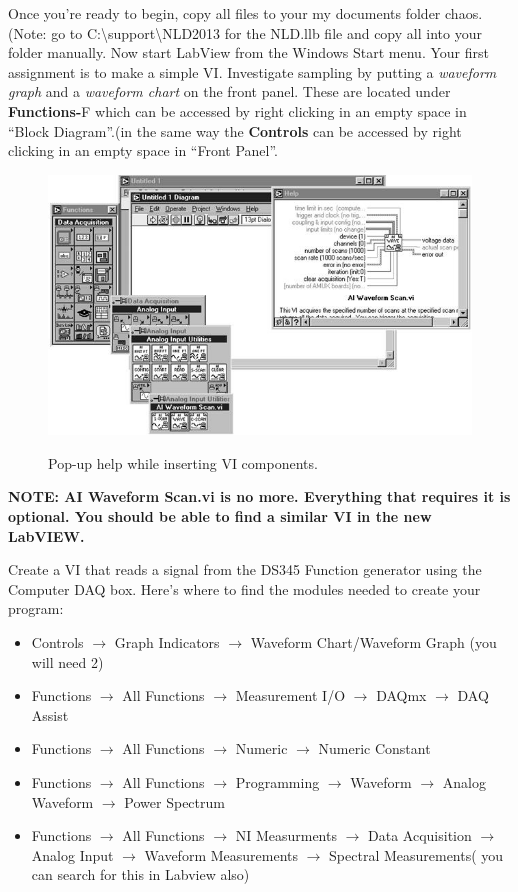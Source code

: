 \documentclass{../lab}
\begin{document}
Once you're ready to begin, copy all files to your my documents folder chaos. (Note: go to C:\textbackslash support\textbackslash NLD2013 for the NLD.llb file and copy all into your folder manually. Now start LabView from the Windows Start menu. Your first assignment is to make a simple VI. Investigate sampling by putting a \emph{waveform graph} and a \emph{waveform chart} on the front panel. These are located under \textbf{Functions-}F which can be accessed by right clicking in an empty space in ``Block Diagram''.(in the same way the \textbf{Controls} can be accessed by right clicking in an empty space in ``Front Panel''.

\begin{figure}[h]
    \centering
    \href{http://experimentationlab.berkeley.edu/sites/default/files/images/Nldimage067.jpg}{\includegraphics[width=0.5\linewidth]{images/Nldimage067.jpg}}
    \caption{Pop-up help while inserting VI components.}
    \label{fig:Nldimage067}
\end{figure}

\textbf{NOTE: AI Waveform Scan.vi is no more. Everything that requires it is optional. You should be able to find a similar VI in the new LabVIEW.}

Create a VI that reads a signal from the DS345 Function generator using the Computer DAQ box. Here's where to find the modules needed to create your program:

\newpage

\begin{itemize}
    \item Controls $\rightarrow$ Graph Indicators $\rightarrow$ Waveform Chart/Waveform Graph (you will need 2)

    \item Functions $\rightarrow$ All Functions  $\rightarrow$  Measurement I/O  $\rightarrow$  DAQmx $\rightarrow$  DAQ Assist

    \item Functions $\rightarrow$ All Functions $\rightarrow$ Numeric $\rightarrow$ Numeric Constant

    \item Functions $\rightarrow$ All Functions $\rightarrow$ Programming $\rightarrow$ Waveform $\rightarrow$ Analog Waveform $\rightarrow$ Power Spectrum

    \item Functions $\rightarrow$ All Functions $\rightarrow$ NI Measurments $\rightarrow$ Data Acquisition $\rightarrow$ Analog Input $\rightarrow$ Waveform Measurements $\rightarrow$ Spectral Measurements( you can search for this in Labview also)
\end{itemize}
\end{document}
